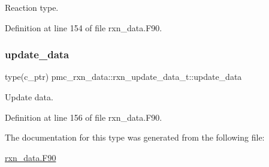 Reaction type. 



Definition at line 154 of file rxn\+\_\+data.\+F90.

\mbox{\label{structpmc__rxn__data_1_1rxn__update__data__t_aae0fc951efa345e6f8158fb646708322}} 
\subsubsection{\texorpdfstring{update\+\_\+data}{update\_data}}
{\footnotesize\ttfamily type(c\+\_\+ptr) pmc\+\_\+rxn\+\_\+data\+::rxn\+\_\+update\+\_\+data\+\_\+t\+::update\+\_\+data\hspace{0.3cm}{\ttfamily [private]}}



Update data. 



Definition at line 156 of file rxn\+\_\+data.\+F90.



The documentation for this type was generated from the following file\+:\begin{DoxyCompactItemize}
\item 
\mbox{\hyperlink{rxn__data_8_f90}{rxn\+\_\+data.\+F90}}\end{DoxyCompactItemize}
